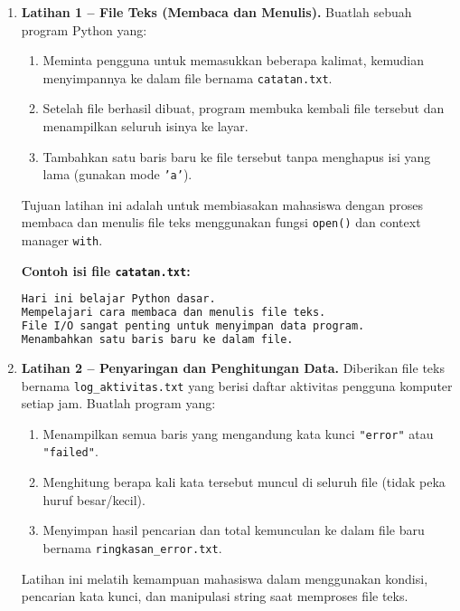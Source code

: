 \begin{enumerate}
    
\item \textbf{Latihan 1 – File Teks (Membaca dan Menulis).}  
Buatlah sebuah program Python yang:
\begin{enumerate}
    \item Meminta pengguna untuk memasukkan beberapa kalimat, kemudian menyimpannya ke dalam file bernama \texttt{catatan.txt}.  
    \item Setelah file berhasil dibuat, program membuka kembali file tersebut dan menampilkan seluruh isinya ke layar.  
    \item Tambahkan satu baris baru ke file tersebut tanpa menghapus isi yang lama (gunakan mode \texttt{'a'}).  
\end{enumerate}

Tujuan latihan ini adalah untuk membiasakan mahasiswa dengan proses membaca dan menulis file teks menggunakan fungsi \texttt{open()} dan context manager \texttt{with}.

\noindent\textbf{Contoh isi file \texttt{catatan.txt}:}

\begin{lstlisting}[language=bash, caption={Isi file catatan.txt yang dihasilkan}]
Hari ini belajar Python dasar.
Mempelajari cara membaca dan menulis file teks.
File I/O sangat penting untuk menyimpan data program.
Menambahkan satu baris baru ke dalam file.
\end{lstlisting}


\item \textbf{Latihan 2 – Penyaringan dan Penghitungan Data.}  
Diberikan file teks bernama \texttt{log\_aktivitas.txt} yang berisi daftar aktivitas pengguna komputer setiap jam.  
Buatlah program yang:
\begin{enumerate}
    \item Menampilkan semua baris yang mengandung kata kunci \texttt{"error"} atau \texttt{"failed"}.  
    \item Menghitung berapa kali kata tersebut muncul di seluruh file (tidak peka huruf besar/kecil).  
    \item Menyimpan hasil pencarian dan total kemunculan ke dalam file baru bernama \texttt{ringkasan\_error.txt}.  
\end{enumerate}

Latihan ini melatih kemampuan mahasiswa dalam menggunakan kondisi, pencarian kata kunci, dan manipulasi string saat memproses file teks.


\end{enumerate}

